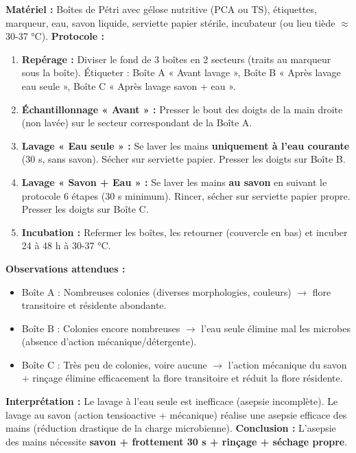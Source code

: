 \documentclass[11pt]{article}
\begin{document}
\begin{experience}
\textbf{Matériel :} Boîtes de Pétri avec gélose nutritive (PCA ou TS), étiquettes, marqueur, eau, savon liquide, serviette papier stérile, incubateur (ou lieu tiède $\approx$ 30-37 °C).
\textbf{Protocole :}
\begin{enumerate}
    \item \textbf{Repérage :} Diviser le fond de 3 boîtes en 2 secteurs (traits au marqueur sous la boîte). Étiqueter : Boîte A « Avant lavage », Boîte B « Après lavage eau seule », Boîte C « Après lavage savon + eau ».
    \item \textbf{Échantillonnage « Avant » :} Presser le bout des doigts de la main droite (non lavée) sur le secteur correspondant de la Boîte A.
    \item \textbf{Lavage « Eau seule » :} Se laver les mains \textbf{uniquement à l'eau courante} (30 s, sans savon). Sécher sur serviette papier. Presser les doigts sur Boîte B.
    \item \textbf{Lavage « Savon + Eau » :} Se laver les mains \textbf{au savon} en suivant le protocole 6 étapes (30 s minimum). Rincer, sécher sur serviette papier propre. Presser les doigts sur Boîte C.
    \item \textbf{Incubation :} Refermer les boîtes, les retourner (couvercle en bas) et incuber 24 à 48 h à 30-37 °C.
\end{enumerate}
\textbf{Observations attendues :}
\begin{itemize}
    \item Boîte A : Nombreuses colonies (diverses morphologies, couleurs) $\rightarrow$ flore transitoire et résidente abondante.
    \item Boîte B : Colonies encore nombreuses $\rightarrow$ l'eau seule élimine mal les microbes (absence d'action mécanique/détergente).
    \item Boîte C : Très peu de colonies, voire aucune $\rightarrow$ l'action mécanique du savon + rinçage élimine efficacement la flore transitoire et réduit la flore résidente.
\end{itemize}
\textbf{Interprétation :} Le lavage à l'eau seule est inefficace (asepsie incomplète). Le lavage au savon (action tensioactive + mécanique) réalise une asepsie efficace des mains (réduction drastique de la charge microbienne).
\textbf{Conclusion :} L'asepsie des mains nécessite \textbf{savon + frottement 30 s + rinçage + séchage propre}.
\end{experience}
\end{document}
